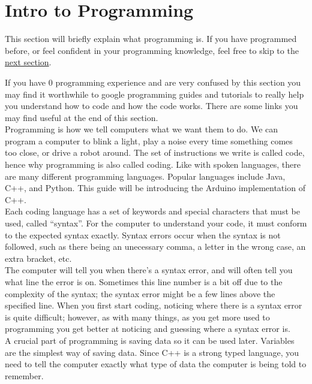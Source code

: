 \documentclass[../TinyBot.tex]{subfiles}
\begin{document}
\section{Intro to Programming}

This section will briefly explain what programming is. If you have programmed before, or feel
confident in your programming knowledge, feel free to skip to the \href{sec:introarduino}{next section}.


If you have 0 programming experience and are very confused by this section you may find it
worthwhile to google programming guides and tutorials to really help you understand how to
code and how the code works. There are some links you may find useful at the end of this section. \\


Programming is how we tell computers what we want them to do. We can program a computer to blink a
light, play a noise every time something comes too close, or drive a robot around. The set of
instructions we write is called code, hence why programming is also called coding. Like with spoken
languages, there are many different programming languages. Popular languages include Java, C++,
and Python. This guide will be introducing the Arduino implementation of C++. \\

Each coding language has a set of keywords and special characters that must be used, called ``syntax''.
For the computer to understand your code, it must conform to the expected syntax exactly.
Syntax errors occur when the syntax is not followed, such as there being an unecessary comma,
a letter in the wrong case, an extra bracket, etc. \\

The computer will tell you when there's a syntax error, and will often tell you what line
the error is on. Sometimes this line number is a bit off due to the complexity of the syntax;
the syntax error might be a few lines above the specified line. When you first start coding,
noticing where there is a syntax error is quite difficult; however, as with many things,
as you get more used to programming you get better at noticing and guessing where a syntax error is. \\ 

A crucial part of programming is saving data so it can be used later. Variables are the simplest way
of saving data. Since C++ is a strong typed language, you need to tell the computer exactly what type
of data the computer is being told to remember.\\
\end{document}
